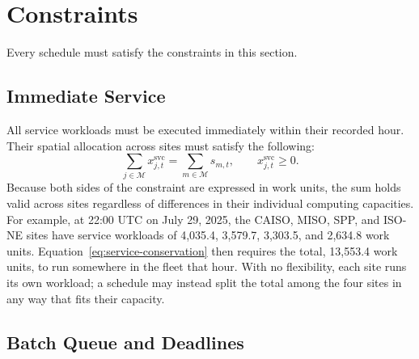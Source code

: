\documentclass{UNCC-thesis}
\begin{document}
\section{Constraints}
\label{sec:problem-statement}

Every schedule must satisfy the constraints in this section.

\subsection{Immediate Service}
\label{subsec:problem-service}

All service workloads must be executed immediately within their recorded hour. Their
spatial allocation across sites must satisfy the following:
\begin{equation}
  \sum_{j\in\mathcal M}x^{\mathrm{svc}}_{j,t}
  =
  \sum_{m\in\mathcal M}s_{m,t},
  \qquad
  x^{\mathrm{svc}}_{j,t}\geq0.
  \label{eq:service-conservation}
\end{equation}
Because both sides of the constraint are expressed in work units, the
sum holds valid across sites regardless of differences in their individual computing
capacities. For example, at 22:00 UTC on July 29, 2025, the CAISO, MISO, SPP, and
ISO-NE sites have service workloads of 4,035.4, 3,579.7, 3,303.5, and 2,634.8 work
units. Equation~\eqref{eq:service-conservation} then requires the total, 13,553.4 work
units, to run somewhere in the fleet that hour. With no flexibility, each site runs its
own workload; a schedule may instead split the total among the four sites in any way
that fits their capacity.

\subsection{Batch Queue and Deadlines}
\label{subsec:problem-batch}
\end{document}
